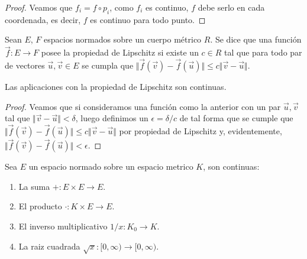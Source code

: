 \documentclass[11pt,oneside,a4paper]{book}
\begin{document}
\begin{proof}
Veamos que $f_i=f\circ p_i$, como $f_i$ es continuo, $f$ debe serlo en cada coordenada, es decir, $f$ es continuo para todo punto.
\end{proof}
\begin{mydef}
Sean $E$, $F$ espacios normados sobre un cuerpo métrico $R$. Se dice que una función $\vec{f}:E\rightarrow F$ posee la propiedad de Lipschitz si existe un $c\in R$ tal que para todo par de vectores $\vec{u},\vec{v}\in E$ se cumpla que $\Vert\vec{f}(\vec{v})-\vec{f}(\vec{u})\Vert\leq c\Vert\vec{v}-\vec{u}\Vert$.
\end{mydef}
\begin{thm}
Las aplicaciones con la propiedad de Lipschitz son continuas.
\end{thm}
\begin{proof}
Veamos que si consideramos una función como la anterior con un par $\vec{u},\vec{v}$ tal que $\Vert\vec{v}-\vec{u}\Vert\lt\delta$, luego definimos un $\epsilon=\delta/c$ de tal forma que se cumple que $\Vert\vec{f}(\vec{v})-\vec{f}(\vec{u})\Vert\leq c\Vert\vec{v}-\vec{u}\Vert$ por propiedad de Lipschitz y, evidentemente, $\Vert\vec{f}(\vec{v})-\vec{f}(\vec{u})\Vert\lt\epsilon$.
\end{proof}
\begin{thm}
Sea $E$ un espacio normado sobre un espacio metrico $K$, son continuas:
\begin{enumerate}[(1)]
\item La suma $+:E\times E\rightarrow E$.
\item El producto $\cdot:K\times E\rightarrow E$.
\item El inverso multiplicativo $1/x:K_0\rightarrow K$.
\item La raiz cuadrada $\sqrt{x}:[0,\infty)\rightarrow[0,\infty)$.
\end{enumerate}
\end{thm}
\end{document}
